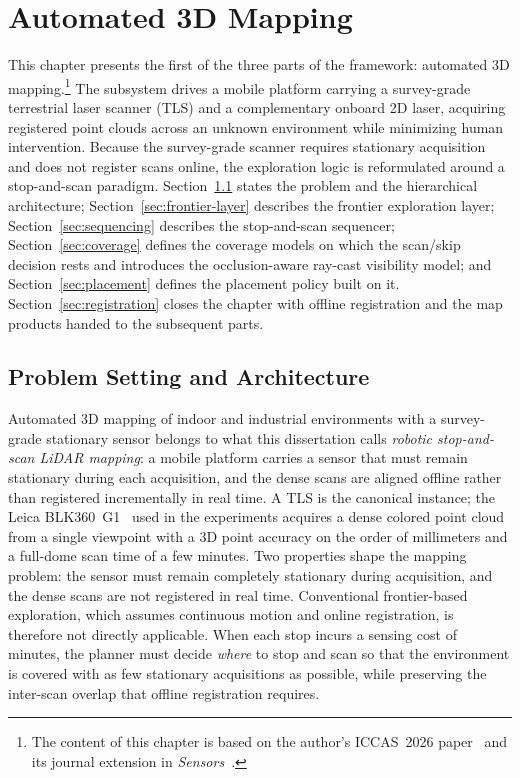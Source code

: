 \chapter{Automated 3D Mapping}
\label{ch:mapping}
This chapter presents the first of the three parts of the framework: automated
3D mapping.\footnote{The content of this chapter is based on the author's ICCAS~2026 paper~\cite{iccas2026} and its journal extension in \emph{Sensors}~\cite{kim2026sensors}.} The subsystem drives a mobile platform carrying a survey-grade
terrestrial laser scanner (TLS) and a complementary onboard 2D laser, acquiring
registered point clouds across an unknown environment while minimizing human
intervention. Because the survey-grade scanner requires stationary acquisition
and does not register scans online, the exploration logic is reformulated
around a stop-and-scan paradigm. Section~\ref{sec:stopscan-arch} states the
problem and the hierarchical architecture; Section~\ref{sec:frontier-layer}
describes the frontier exploration layer; Section~\ref{sec:sequencing}
describes the stop-and-scan sequencer; Section~\ref{sec:coverage} defines the
coverage models on which the scan/skip decision rests and introduces the
occlusion-aware ray-cast visibility model; and Section~\ref{sec:placement}
defines the placement policy built on it. Section~\ref{sec:registration}
closes the chapter with offline registration and the map products handed to
the subsequent parts.

\section{Problem Setting and Architecture}
\label{sec:stopscan-arch}

Automated 3D mapping of indoor and industrial environments with a survey-grade
stationary sensor belongs to what this dissertation calls \emph{robotic
stop-and-scan LiDAR mapping}: a mobile platform carries a sensor that must
remain stationary during each acquisition, and the dense scans are aligned
offline rather than registered incrementally in real time. A TLS is the
canonical instance; the Leica BLK360~G1~\cite{leica-blk360} used in the
experiments acquires a dense colored point cloud from a single viewpoint with a
3D point accuracy on the order of millimeters and a full-dome scan time of a few
minutes. Two properties shape the mapping problem: the sensor must remain
completely stationary during acquisition, and the dense scans are not
registered in real time. Conventional frontier-based exploration, which assumes
continuous motion and online registration, is therefore not directly
applicable. When each stop incurs a sensing cost of minutes, the planner
must decide \emph{where} to stop and scan so that the environment is covered
with as few stationary acquisitions as possible, while preserving the
inter-scan overlap that offline registration requires.

